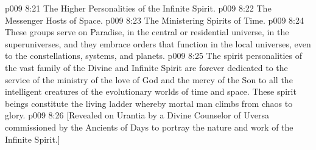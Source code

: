 \pc \vs p009 8:21 \bibnobreakspace The Higher Personalities of the Infinite Spirit.
\vs p009 8:22 \bibnobreakspace The Messenger Hosts of Space.
\vs p009 8:23 \bibnobreakspace The Ministering Spirits of Time.
\vs p009 8:24 These groups serve on Paradise, in the central or residential universe, in the superuniverses, and they embrace orders that function in the local universes, even to the constellations, systems, and planets.
\vs p009 8:25 The spirit personalities of the vast family of the Divine and Infinite Spirit are forever dedicated to the service of the ministry of the love of God and the mercy of the Son to all the intelligent creatures of the evolutionary worlds of time and space. These spirit beings constitute the living ladder whereby mortal man climbs from chaos to glory.\plusone
\vsetoff
\vs p009 8:26 [Revealed on Urantia by a Divine Counselor of Uversa commissioned by the Ancients of Days to portray the nature and work of the Infinite Spirit.]
